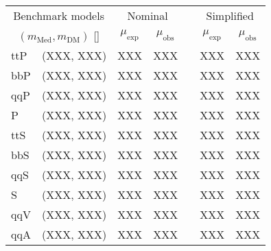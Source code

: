 \begin{table*}[!t]
  \label{tab:aggr_limits}
  \centering
  \begin{tabular}{ llccccc }
    \hline
    \multicolumn{2}{c}{Benchmark models}    & \multicolumn{2}{c}{Nominal}
                                            & 
                                            & \multicolumn{2}{c}{Simplified}             \\ [0.3ex]
    \cline{3-4}
    \cline{6-7}
   \multicolumn{2}{c}{$(m_{\text{Med}}, m_{\mathrm{DM}})$ [\GeVns{}]} 
                                            & $\mu_{\text{exp}}$
                                            & $\mu_{\text{obs}}$
                                            & 
                                            & $\mu_{\text{exp}}$
                                            & $\mu_{\text{obs}}$                         \\ [0.3ex]
    \hline
    \multirow{1}{*}{ttP} & (XXX, XXX)  & XXX & XXX &  & XXX & XXX \\
    \multirow{1}{*}{bbP} & (XXX, XXX)  & XXX & XXX &  & XXX & XXX \\
    \multirow{1}{*}{qqP} & (XXX, XXX)  & XXX & XXX &  & XXX & XXX \\
    \multirow{1}{*}{P}   & (XXX, XXX)  & XXX & XXX &  & XXX & XXX \\
    \multirow{1}{*}{ttS} & (XXX, XXX)  & XXX & XXX &  & XXX & XXX \\
    \multirow{1}{*}{bbS} & (XXX, XXX)  & XXX & XXX &  & XXX & XXX \\
    \multirow{1}{*}{qqS} & (XXX, XXX)  & XXX & XXX &  & XXX & XXX \\
    \multirow{1}{*}{S}   & (XXX, XXX)  & XXX & XXX &  & XXX & XXX \\
    \multirow{1}{*}{qqV} & (XXX, XXX)  & XXX & XXX &  & XXX & XXX \\
    \multirow{1}{*}{qqA} & (XXX, XXX)  & XXX & XXX &  & XXX & XXX \\
    \hline
  \end{tabular}
\end{table*}


